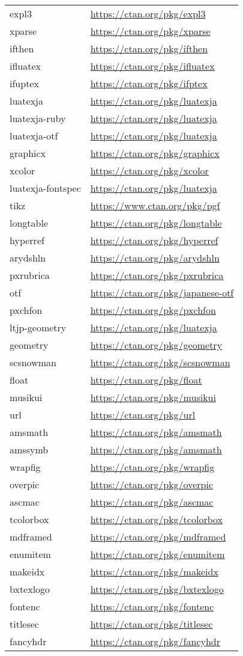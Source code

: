 \documentclass[lualatex,ja=standard,a4paper]{bxjsarticle}
\begin{document}
\begin{longtable}{ll}
expl3&\url{https://ctan.org/pkg/expl3}\\
xparse&\url{https://ctan.org/pkg/xparse}\\
ifthen&\url{https://ctan.org/pkg/ifthen}\\
ifluatex&\url{https://ctan.org/pkg/ifluatex}\\
ifuptex&\url{https://ctan.org/pkg/ifptex}\\
luatexja&\url{https://ctan.org/pkg/luatexja}\\
luatexja-ruby&\url{https://ctan.org/pkg/luatexja}\\
luatexja-otf&\url{https://ctan.org/pkg/luatexja}\\
graphicx&\url{https://ctan.org/pkg/graphicx}\\
xcolor&\url{https://ctan.org/pkg/xcolor}\\
luatexja-fontspec&\url{https://ctan.org/pkg/luatexja}\\
tikz&\url{https://www.ctan.org/pkg/pgf}\\
longtable&\url{https://ctan.org/pkg/longtable}\\
hyperref&\url{https://ctan.org/pkg/hyperref}\\
arydshln&\url{https://ctan.org/pkg/arydshln}\\
pxrubrica&\url{https://ctan.org/pkg/pxrubrica}\\
otf&\url{https://ctan.org/pkg/japanese-otf}\\
pxchfon&\url{https://ctan.org/pkg/pxchfon}\\
ltjp-geometry&\url{https://ctan.org/pkg/luatexja}\\
geometry&\url{https://ctan.org/pkg/geometry}\\
scsnowman&\url{https://ctan.org/pkg/scsnowman}\\
float&\url{https://ctan.org/pkg/float}\\
musikui&\url{https://ctan.org/pkg/musikui}\\
url&\url{https://ctan.org/pkg/url}\\
amsmath&\url{https://ctan.org/pkg/amsmath}\\
amssymb&\url{https://ctan.org/pkg/amsmath}\\
wrapfig&\url{https://ctan.org/pkg/wrapfig}\\
overpic&\url{https://ctan.org/pkg/overpic}\\
ascmac&\url{https://ctan.org/pkg/ascmac}\\
tcolorbox&\url{https://ctan.org/pkg/tcolorbox}\\
mdframed&\url{https://ctan.org/pkg/mdframed}\\
enumitem&\url{https://ctan.org/pkg/enumitem}\\
makeidx&\url{https://ctan.org/pkg/makeidx}\\
bxtexlogo&\url{https://ctan.org/pkg/bxtexlogo}\\
fontenc&\url{https://ctan.org/pkg/fontenc}\\
titlesec&\url{https://ctan.org/pkg/titlesec}\\
fancyhdr&\url{https://ctan.org/pkg/fancyhdr}\\
\end{longtable}
\end{document}
